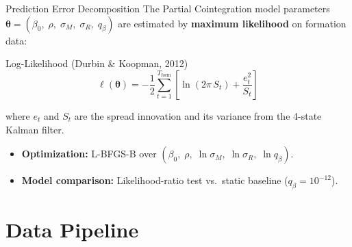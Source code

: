 \documentclass[10pt, aspectratio=169]{beamer}
\begin{document}
\begin{frame}{Prediction Error Decomposition}
  The Partial Cointegration model parameters $\bm{\theta} = (\beta_0,\;\rho,\;\sigma_M,\;\sigma_R,\;q_\beta)$
  are estimated by \textbf{maximum likelihood} on formation data:
  \begin{block}{Log-Likelihood (Durbin \& Koopman, 2012)}
    \[
      \ell(\bm{\theta}) = -\frac{1}{2}\sum_{t=1}^{T_{\text{form}}}
        \left[\ln(2\pi\,S_t) + \frac{e_t^2}{S_t}\right]
    \]
  \end{block}
  where $e_t$ and $S_t$ are the spread innovation and its variance from the 4-state Kalman filter.
  \vspace{4pt}
  \begin{itemize}
    \item \textbf{Optimization:} L-BFGS-B over $(\beta_0,\; \rho,\; \ln\sigma_M,\; \ln\sigma_R,\; \ln q_\beta)$.
    \item \textbf{Model comparison:} Likelihood-ratio test vs.\ static baseline
          ($q_\beta = 10^{-12}$).
  \end{itemize}
\end{frame}

\section{Data Pipeline}
\end{document}

